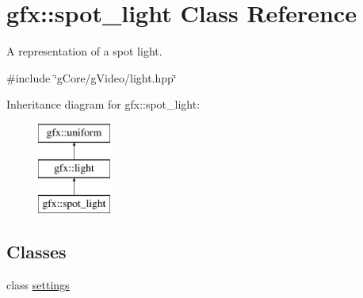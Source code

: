 \hypertarget{classgfx_1_1spot__light}{\section{gfx\-:\-:spot\-\_\-light Class Reference}
\label{classgfx_1_1spot__light}
}


A representation of a spot light.  




{\ttfamily \#include \char`\"{}g\-Core/g\-Video/light.\-hpp\char`\"{}}

Inheritance diagram for gfx\-:\-:spot\-\_\-light\-:\begin{figure}[H]
\begin{center}
\leavevmode
\includegraphics[height=3.000000cm]{classgfx_1_1spot__light}
\end{center}
\end{figure}
\subsection*{Classes}
\begin{DoxyCompactItemize}
\item 
class \hyperlink{classgfx_1_1spot__light_1_1settings}{settings}
\end{DoxyCompactItemize}
